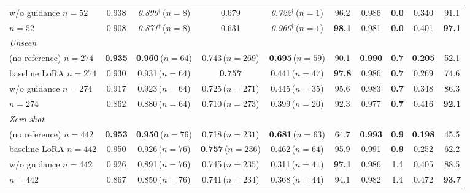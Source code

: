 \begin{table}[H]
\begin{tabular}{lccccccccc}
        \segue{} w/o guidance {\tiny\color{gray}$n{=}52$} & 0.938 & \textit{0.899}$^{\dagger}${\tiny\,($n{=}8$)} & 0.679 & \textit{0.722}$^{\dagger}${\tiny\,($n{=}1$)} & 96.2 & 0.986 & \textbf{0.0} & 0.340 & 91.1 \\
        \segue{} {\tiny\color{gray}$n{=}52$} & 0.908 & \textit{0.871}$^{\dagger}${\tiny\,($n{=}8$)} & 0.631 & \textit{0.960}$^{\dagger}${\tiny\,($n{=}1$)} & \textbf{98.1} & 0.981 & \textbf{0.0} & 0.401 & \textbf{97.1} \\
        \midrule
        \multicolumn{10}{l}{\emph{Unseen}} \\
        \ltx{} (no reference) {\tiny\color{gray}$n{=}274$} & \textbf{0.935} & \textbf{0.960}{\tiny\,($n{=}64$)} & 0.743{\tiny\,($n{=}269$)} & \textbf{0.695}{\tiny\,($n{=}59$)} & 90.1 & \textbf{0.990} & \textbf{0.7} & \textbf{0.205} & 52.1 \\
        \ltx{} baseline LoRA {\tiny\color{gray}$n{=}274$} & 0.930 & 0.931{\tiny\,($n{=}64$)} & \textbf{0.757} & 0.441{\tiny\,($n{=}47$)} & \textbf{97.8} & 0.986 & \textbf{0.7} & 0.269 & 74.6 \\
        \segue{} w/o guidance {\tiny\color{gray}$n{=}274$} & 0.917 & 0.923{\tiny\,($n{=}64$)} & 0.725{\tiny\,($n{=}271$)} & 0.445{\tiny\,($n{=}35$)} & 95.6 & 0.983 & \textbf{0.7} & 0.348 & 86.3 \\
        \segue{} {\tiny\color{gray}$n{=}274$} & 0.862 & 0.880{\tiny\,($n{=}64$)} & 0.710{\tiny\,($n{=}273$)} & 0.399{\tiny\,($n{=}20$)} & 92.3 & 0.977 & \textbf{0.7} & 0.416 & \textbf{92.1} \\
        \midrule
        \multicolumn{10}{l}{\emph{Zero-shot}} \\
        \ltx{} (no reference) {\tiny\color{gray}$n{=}442$} & \textbf{0.953} & \textbf{0.950}{\tiny\,($n{=}76$)} & 0.718{\tiny\,($n{=}231$)} & \textbf{0.681}{\tiny\,($n{=}63$)} & 64.7 & \textbf{0.993} & \textbf{0.9} & \textbf{0.198} & 45.5 \\
        \ltx{} baseline LoRA {\tiny\color{gray}$n{=}442$} & 0.950 & 0.926{\tiny\,($n{=}76$)} & \textbf{0.757}{\tiny\,($n{=}236$)} & 0.462{\tiny\,($n{=}64$)} & 95.9 & 0.991 & \textbf{0.9} & 0.252 & 62.2 \\
        \segue{} w/o guidance {\tiny\color{gray}$n{=}442$} & 0.926 & 0.891{\tiny\,($n{=}76$)} & 0.745{\tiny\,($n{=}235$)} & 0.311{\tiny\,($n{=}41$)} & \textbf{97.1} & 0.986 & 1.4 & 0.405 & 88.5 \\
        \segue{} {\tiny\color{gray}$n{=}442$} & 0.867 & 0.850{\tiny\,($n{=}76$)} & 0.741{\tiny\,($n{=}234$)} & 0.368{\tiny\,($n{=}44$)} & 94.1 & 0.982 & 1.4 & 0.472 & \textbf{93.7} \\
        \bottomrule
    \end{tabular}
\end{table}
